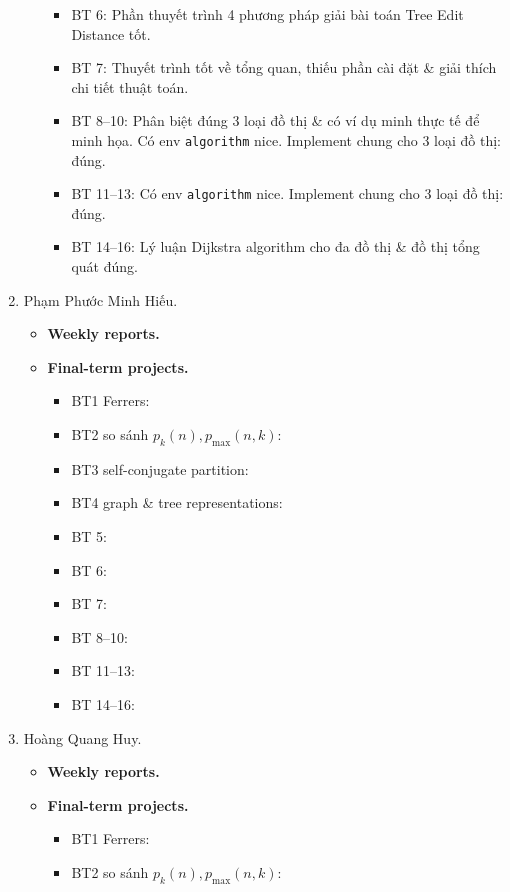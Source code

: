 \documentclass{article}
\begin{document}
\begin{enumerate}
\begin{itemize}
\begin{itemize}
            \item BT 6: Phần thuyết trình 4 phương pháp giải bài toán Tree Edit Distance tốt.
            \item BT 7: Thuyết trình tốt về tổng quan, thiếu phần cài đặt \& giải thích chi tiết thuật toán.
            \item BT 8--10: Phân biệt đúng 3 loại đồ thị \& có ví dụ minh thực tế để minh họa. Có env {\tt algorithm} nice. Implement chung cho 3 loại đồ thị: đúng.
            \item BT 11--13: Có env {\tt algorithm} nice. Implement chung cho 3 loại đồ thị: đúng.
            \item BT 14--16: Lý luận Dijkstra algorithm cho đa đồ thị \& đồ thị tổng quát đúng.
        \end{itemize}
    \end{itemize}
    \item {\sc Phạm Phước Minh Hiếu.}
    \begin{itemize}
        \item {\bf Weekly reports.}
        \item {\bf Final-term projects.}
        \begin{itemize}
            \item BT1 Ferrers:
            \item BT2 so sánh $p_k(n),p_{\max}(n,k)$:
            \item BT3 self-conjugate partition:
            \item BT4 graph \& tree representations:
            \item BT 5:
            \item BT 6:
            \item BT 7:
            \item BT 8--10:
            \item BT 11--13:
            \item BT 14--16:
        \end{itemize}
    \end{itemize}
    \item {\sc Hoàng Quang Huy.}
    \begin{itemize}
        \item {\bf Weekly reports.}
        \item {\bf Final-term projects.}
        \begin{itemize}
            \item BT1 Ferrers:
            \item BT2 so sánh $p_k(n),p_{\max}(n,k)$:

\end{itemize}
\end{itemize}
\end{enumerate}
\end{document}
